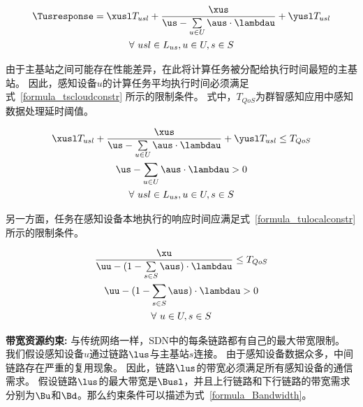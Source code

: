 \begin{equation}
\label{formula_Tusresponse}
\begin{gathered}
\Tusresponse = \xusl T_{usl} + \frac{\xus}{\us-\sum\limits_{u \in U}\aus \cdot \lambdau} + \yusl T_{usl}\\
\forall \ usl\in L_{us}, u\in U, s\in S\\
\end{gathered}
\end{equation}

由于主基站之间可能存在性能差异，在此将计算任务被分配给执行时间最短的主基站。
因此，感知设备$u$的计算任务平均执行时间必须满足式~\eqref{formula_tscloudconstr} 所示的限制条件。
式中，$T_{QoS}$为群智感知应用中感知数据处理延时阈值。

\begin{equation}
\label{formula_tscloudconstr}
\begin{gathered}
\xusl T_{usl} + \frac{\xus}{\us-\sum\limits_{u \in U}\aus \cdot \lambdau} + \yusl T_{usl} \leq T_{QoS}\\
\us-\sum\limits_{u \in U}\aus \cdot \lambdau > 0\\
\forall \ usl\in L_{us}, u\in U, s\in S\\
\end{gathered}
\end{equation}

另一方面，任务在感知设备本地执行的响应时间应满足式~\eqref{formula_tulocalconstr} 所示的限制条件。

\begin{equation}
\label{formula_tulocalconstr}
\begin{gathered}
\frac{\xu}{\uu - (1 - \sum\limits_{s \in S} \aus) \cdot \lambdau} \leq T_{QoS}\\
\uu - (1 - \sum\limits_{s \in S}\aus) \cdot \lambdau > 0\\
\forall \ u\in U, s\in S\\
\end{gathered}
\end{equation}

\textbf{带宽资源约束:}
与传统网络一样，SDN中的每条链路都有自己的最大带宽限制。
我们假设感知设备$u$通过链路$\lus$与主基站$s$连接。
由于感知设备数据众多，中间链路存在严重的复用现象。
因此，链路$\lus$的带宽必须满足所有感知设备的通信需求。
假设链路$\lus$的最大带宽是$\Busl$，并且上行链路和下行链路的带宽需求分别为$\Bu$和$\Bd$。那么约束条件可以描述为式~\eqref{formula_Bandwidth}。

